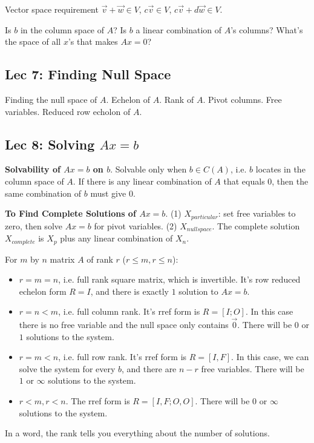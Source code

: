 Vector space requirement $\vec{v}+\vec{w}\in V$, $c\vec{v}\in V$,
$c\vec{v}+d\vec{w} \in V$.

Is $b$ in the column space of $A$? Is $b$ a linear combination of $A$'s columns?
What's the space of all $x$'s that makes $Ax=0$?

\subsection{Lec 7: Finding Null Space}

Finding the null space of $A$. Echelon of $A$. Rank of $A$. Pivot columns.
Free variables. Reduced row echolon of $A$.

\subsection{Lec 8: Solving $Ax=b$}

{\bf Solvability of $Ax=b$ on $b$}. Solvable only when $b\in C(A)$, i.e.
$b$ locates in the column space of $A$. If there is any linear combination of
$A$ that equals $0$, then the same combination of $b$ must give $0$.

{\bf To Find Complete Solutions of $Ax=b$}. (1) $X_{particular}$: set free
variables to zero, then solve $Ax=b$ for pivot variables. (2) $X_{nullspace}$.
The complete solution $X_{complete}$ is $X_p$ plus any linear combination of
$X_n$.

For $m$ by $n$ matrix $A$ of rank $r$ ($r \leq m, r \leq n$):
\begin{itemize}
	\item $r=m=n$, i.e. full rank square matrix, which is invertible. It's
		row reduced echelon form $R=I$, and there is exactly $1$ solution to
		$Ax=b$.
	\item $r=n<m$, i.e. full column rank. It's rref form is $R=[I;O]$. In this
		case there is no free variable and the null space only contains $\vec{0}$.
		There will be $0$ or $1$ solutions to the system.
	\item $r=m<n$, i.e. full row rank. It's rref form is $R=[I,F]$. In this
		case, we can solve the system for every $b$, and there are $n-r$ free
		variables. There will be $1$ or $\infty$ solutions to the system.
	\item $r<m,r<n$. The rref form is $R=[I,F;O,O]$. There will be $0$ or
		$\infty$ solutions to the system.
\end{itemize}
In a word, the rank tells you everything about the number of solutions.

